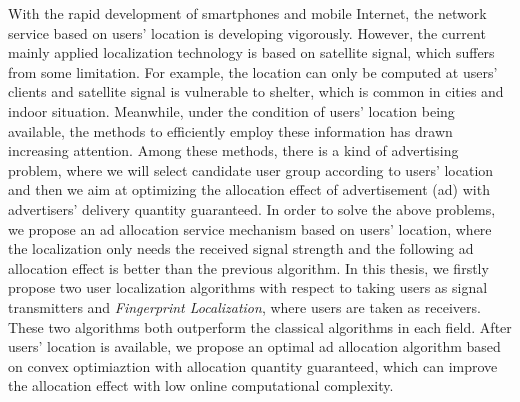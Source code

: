 \begin{eabstract}
   With the rapid development of smartphones and mobile Internet, the network service based on users' location is developing vigorously. However, the current mainly applied localization technology is based on satellite signal, which suffers from some limitation. For example, the location can only be computed at users' clients and satellite signal is vulnerable to shelter, which is common in cities and indoor situation. Meanwhile, under the condition of users' location being available, the methods to efficiently employ these information has drawn increasing attention. Among these methods, there is a kind of advertising problem, where we will select candidate user group according to users' location and then we aim at optimizing the allocation effect of advertisement (ad) with advertisers' delivery quantity guaranteed. In order to solve the above problems, we propose an ad allocation service mechanism based on users' location, where the localization only needs the received signal strength and the following ad allocation effect is better than the previous algorithm. In this thesis, we firstly propose two user localization algorithms with respect to taking users as signal transmitters and \textit{Fingerprint Localization}, where users are taken as receivers. These two algorithms both outperform the classical algorithms in each field. After users' location is available, we propose an optimal ad allocation algorithm based on convex optimiaztion with allocation quantity guaranteed, which can improve the allocation effect with low online computational complexity. 
   

\end{eabstract}
